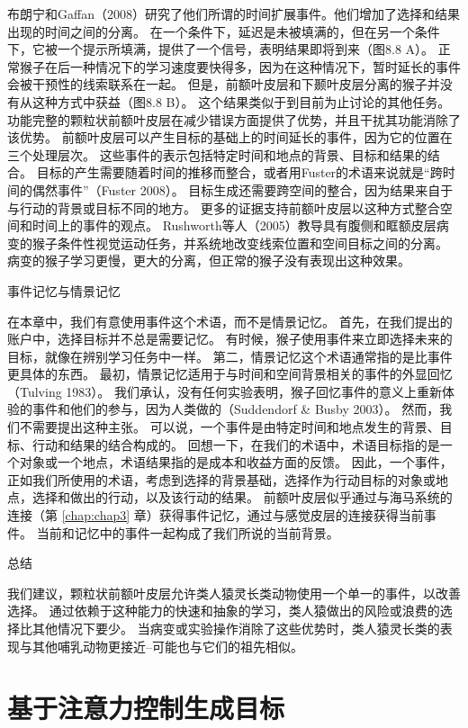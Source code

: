 布朗宁和Gaffan（2008）研究了他们所谓的时间扩展事件。他们增加了选择和结果出现的时间之间的分离。
在一个条件下，延迟是未被填满的，但在另一个条件下，它被一个提示所填满，提供了一个信号，表明结果即将到来（图8.8 A）。
正常猴子在后一种情况下的学习速度要快得多，因为在这种情况下，暂时延长的事件会被干预性的线索联系在一起。
但是，前额叶皮层和下颞叶皮层分离的猴子并没有从这种方式中获益（图8.8 B）。
这个结果类似于到目前为止讨论的其他任务。
功能完整的颗粒状前额叶皮层在减少错误方面提供了优势，并且干扰其功能消除了该优势。
前额叶皮层可以产生目标的基础上的时间延长的事件，因为它的位置在三个处理层次。
这些事件的表示包括特定时间和地点的背景、目标和结果的结合。
目标的产生需要随着时间的推移而整合，或者用Fuster的术语来说就是“跨时间的偶然事件”（Fuster 2008）。
目标生成还需要跨空间的整合，因为结果来自于与行动的背景或目标不同的地方。
更多的证据支持前额叶皮层以这种方式整合空间和时间上的事件的观点。
Rushworth等人（2005）教导具有腹侧和眶额皮层病变的猴子条件性视觉运动任务，并系统地改变线索位置和空间目标之间的分离。
病变的猴子学习更慢，更大的分离，但正常的猴子没有表现出这种效果。



事件记忆与情景记忆

在本章中，我们有意使用事件这个术语，而不是情景记忆。
首先，在我们提出的账户中，选择目标并不总是需要记忆。
有时候，猴子使用事件来立即选择未来的目标，就像在辨别学习任务中一样。
第二，情景记忆这个术语通常指的是比事件更具体的东西。
最初，情景记忆适用于与时间和空间背景相关的事件的外显回忆（Tulving 1983）。
我们承认，没有任何实验表明，猴子回忆事件的意义上重新体验的事件和他们的参与，因为人类做的（Suddendorf \& Busby 2003）。
然而，我们不需要提出这种主张。
可以说，一个事件是由特定时间和地点发生的背景、目标、行动和结果的结合构成的。
回想一下，在我们的术语中，术语目标指的是一个对象或一个地点，术语结果指的是成本和收益方面的反馈。
因此，一个事件，正如我们所使用的术语，考虑到选择的背景基础，选择作为行动目标的对象或地点，选择和做出的行动，以及该行动的结果。
前额叶皮层似乎通过与海马系统的连接（第 \ref{chap:chap3} 章）获得事件记忆，通过与感觉皮层的连接获得当前事件。
当前和记忆中的事件一起构成了我们所说的当前背景。



总结

我们建议，颗粒状前额叶皮层允许类人猿灵长类动物使用一个单一的事件，以改善选择。
通过依赖于这种能力的快速和抽象的学习，类人猿做出的风险或浪费的选择比其他情况下要少。
当病变或实验操作消除了这些优势时，类人猿灵长类的表现与其他哺乳动物更接近--可能也与它们的祖先相似。



\section{基于注意力控制生成目标}

